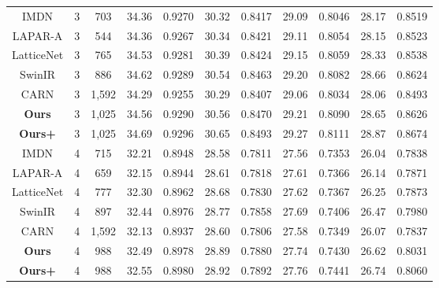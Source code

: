 \documentclass[default,iicol]{sn-jnl}
\theoremstyle{thmstyleone}\newtheorem{theorem}{Theorem}\newtheorem{proposition}[theorem]{Proposition}
\theoremstyle{thmstyletwo}\newtheorem{example}{Example}\newtheorem{remark}{Remark}\theoremstyle{thmstylethree}\newtheorem{definition}{Definition}
\begin{document}
\begin{table*}
{\begin{tabular}{ccccccccccc}
IMDN\cite{hui2019lightweight} & 3 & 703 & 34.36 & 0.9270 & 30.32 & 0.8417 & 29.09 & 0.8046 & 28.17 & 0.8519 \\
LAPAR-A\cite{li2020lapar} & 3 & 544 & 34.36 & 0.9267 & 30.34 & 0.8421 & 29.11 & 0.8054 & 28.15 & 0.8523 \\
LatticeNet\cite{luo2020latticenet} & 3 & 765 & 34.53 & 0.9281 & 30.39 & 0.8424 & 29.15 & 0.8059 & 28.33 & 0.8538 \\
SwinIR\cite{liang2021swinir} & 3 & 886 & {\color{blue}34.62} & 0.9289 & 30.54 & 0.8463 & 29.20 & 0.8082 & {\color{blue}28.66} & 0.8624 \\
CARN\cite{ahn2018fast} & 3 & 1,592 & 34.29 & 0.9255 & 30.29 & 0.8407 & 29.06 & 0.8034 & 28.06 & 0.8493 \\
\textbf{Ours} & 3 & 1,025 & 34.56 & {\color{blue}0.9290} & {\color{blue}30.56} & {\color{blue}0.8470} & {\color{blue}29.21} & {\color{blue}0.8090} & 28.65 & {\color{blue}0.8626} \\
\textbf{Ours+} & 3 & 1,025 & {\color{red}34.69} & {\color{red}0.9296} & {\color{red}30.65} & {\color{red}0.8493} & {\color{red}29.27} & {\color{red}0.8111} & {\color{red}28.87} & {\color{red}0.8674} \\ \hline
IMDN\cite{hui2019lightweight} & 4 & 715 & 32.21 & 0.8948 & 28.58 & 0.7811 & 27.56 & 0.7353 & 26.04 & 0.7838 \\
LAPAR-A\cite{li2020lapar} & 4 & 659 & 32.15 & 0.8944 & 28.61 & 0.7818 & 27.61 & 0.7366 & 26.14 & 0.7871 \\
LatticeNet\cite{luo2020latticenet} & 4 & 777 & 32.30 & 0.8962 & 28.68 & 0.7830 & 27.62 & 0.7367 & 26.25 & 0.7873 \\
SwinIR\cite{liang2021swinir} & 4 & 897 & 32.44 & 0.8976 & 28.77 & 0.7858 & 27.69 & 0.7406 & 26.47 & 0.7980 \\
CARN\cite{ahn2018fast} & 4 & 1,592 & 32.13 & 0.8937 & 28.60 & 0.7806 & 27.58 & 0.7349 & 26.07 & 0.7837 \\
\textbf{Ours} & 4 & 988 & {\color{blue}32.49} & {\color{blue}0.8978} & {\color{blue}28.89} & {\color{blue}0.7880} & {\color{blue}27.74} & {\color{blue}0.7430} & {\color{blue}26.62} & {\color{blue}0.8031} \\
\textbf{Ours+} & 4 & 988 & {\color{red}32.55} & {\color{red}0.8980} & {\color{red}28.92} & {\color{red}0.7892} & {\color{red}27.76} & {\color{red}0.7441} & {\color{red}26.74} & {\color{red}0.8060} \\ \hline
\end{tabular}}
\end{table*}
\end{document}
